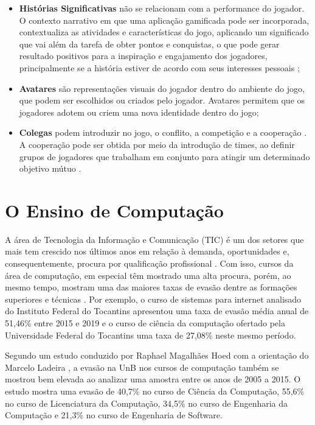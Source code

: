 \begin{itemize}
    \item \textbf{Histórias Significativas} não se relacionam com a performance do jogador. O contexto narrativo em que uma aplicação gamificada pode ser incorporada, contextualiza as atividades e características do jogo, aplicando um significado que vai além da tarefa de obter pontos e conquistas, o que pode gerar resultado positivos para a inspiração e engajamento dos jogadores, principalmente se a história estiver de acordo com seus interesses pessoais \cite{meaningful-gamification};
    \item \textbf{Avatares} são representações visuais do jogador dentro do ambiente do jogo, que podem ser escolhidos ou criados pelo jogador. Avatares permitem que os jogadores adotem ou criem uma nova identidade dentro do jogo;
    \item \textbf{Colegas} podem introduzir no jogo, o conflito, a competição e a cooperação \cite{kapp_gamification}. A cooperação pode ser obtida por meio da introdução de times, ao definir grupos de jogadores que trabalham em conjunto para atingir um determinado objetivo mútuo \cite{ranking_motivation}.
\end{itemize}

\section{O Ensino de Computação}

A área de Tecnologia da Informação e Comunicação (TIC) é um dos setores que mais tem crescido nos últimos anos em relação à demanda, oportunidades e, consequentemente, procura por qualificação profissional \cite{brasscom-tic}. Com isso, cursos da área de computação, em especial têm mostrado uma alta procura, porém, ao mesmo tempo, mostram uma das maiores taxas de evasão dentre as formações superiores e técnicas \cite{evasao-computacao}. Por exemplo, o curso de sistemas para internet analisado do Instituto Federal do Tocantins apresentou uma taxa de evasão média anual de 51,46\% entre 2015 e 2019 e o curso de ciência da computação ofertado pela Universidade Federal do Tocantins uma taxa de 27,08\% neste mesmo período.

Segundo um estudo conduzido por Raphael Magalhães Hoed com a orientação do \prof \dr Marcelo Ladeira \cite{evasao-unb}, a evasão na UnB nos cursos de computação também se mostrou bem elevada ao analizar uma amostra entre os anos de 2005 a 2015. O estudo mostra uma evasão de 40,7\% no curso de Ciência da Computação, 55,6\% no curso de Licenciatura da Computação, 34,5\% no curso de Engenharia da Computação e 21,3\% no curso de Engenharia de Software.

